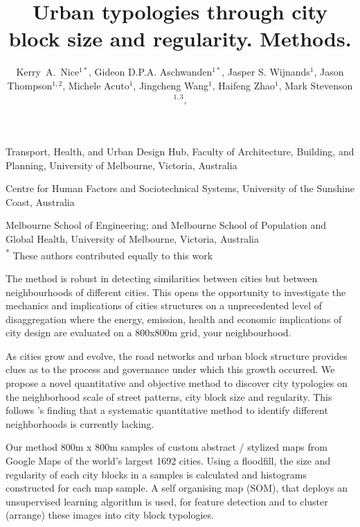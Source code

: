 \documentclass{nature}
\title{Urban typologies through city block size and regularity. Methods.}
\author{Kerry~A.~Nice$^{1*}$,
Gideon D.P.A. Aschwanden$^{1*}$,
Jasper S. Wijnands$^{1}$,
Jason Thompson$^{1,2}$,
Michele Acuto$^{1}$,
Jingcheng Wang$^{1}$,
Haifeng Zhao$^{1}$,
Mark Stevenson$^{1,3}$,
}
\begin{document}
\maketitle

\begin{affiliations}
 \item Transport, Health, and Urban Design Hub, Faculty of Architecture, Building, and Planning, University of Melbourne, Victoria, Australia
 \item Centre for Human Factors and Sociotechnical Systems, University of the Sunshine Coast, Australia
 \item Melbourne School of Engineering; and Melbourne School of Population and Global Health, University of Melbourne, Victoria, Australia
 \\ \textsuperscript{*} These authors contributed equally to this work
\end{affiliations}



The method is robust in detecting similarities between cities but between neighbourhoods of different cities. This opens the opportunity to investigate the mechanics and implications of cities structures on a unprecedented level of disaggregation where the energy, emission, health and economic implications of city design are evaluated on a 800x800m grid, your neighbourhood.



As cities grow and evolve, the road networks and urban block structure provides clues as to the process and governance under which this growth occurred. We propose a novel quantitative and objective method to discover city typologies on the neighborhood scale of street patterns, city block size and regularity. This follows \cite{Louf2014a}'s finding that a systematic quantitative method to identify different neighborhoods is currently lacking. 

Our method 800m x 800m samples of custom abstract / stylized maps from Google Maps of the world's largest 1692 cities. Using a floodfill, the size and regularity of each city blocks in a samples is calculated and histograms constructed for each map sample. A self organising map (SOM), that deploys an unsupervised learning algorithm is used, for feature detection and to cluster (arrange) these images into city block typologies. 
\end{document}
